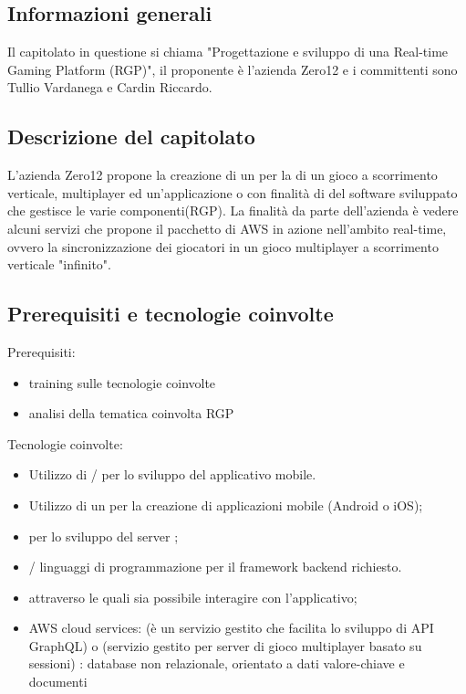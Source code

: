 \subsection{Informazioni generali}
Il capitolato in questione si chiama "Progettazione e sviluppo di una {Real-time Gaming Platform (RGP)}", il proponente è l'azienda Zero12 e i committenti sono Tullio Vardanega e Cardin Riccardo.

\subsection{Descrizione del capitolato}
L’azienda Zero12 propone la creazione di un  per la  di un gioco a scorrimento verticale, multiplayer ed un'applicazione  o  con finalità di  del software sviluppato che gestisce le varie componenti(RGP).
La finalità da parte dell’azienda è vedere alcuni servizi che propone il pacchetto di AWS in azione nell’ambito real-time, ovvero la sincronizzazione dei giocatori in un gioco multiplayer a scorrimento verticale "infinito".
\subsection{Prerequisiti e tecnologie coinvolte}
Prerequisiti:
\begin{itemize}
\item training sulle tecnologie coinvolte
\item analisi della tematica coinvolta RGP 
\end{itemize}
Tecnologie coinvolte:
\begin{itemize}
\item Utilizzo di / per lo sviluppo del applicativo mobile.
\item Utilizzo di un  per la creazione di applicazioni mobile (Android o iOS);
\item {} per lo sviluppo del server ;
\item {}/ linguaggi di programmazione per il framework backend richiesto.
\item {}  attraverso le quali sia possibile interagire con l'applicativo;
\item AWS cloud services: 
(è un servizio gestito che facilita lo sviluppo di API GraphQL) o (servizio gestito per server di gioco multiplayer basato su sessioni) 
: database non relazionale, orientato a dati valore-chiave e documenti
\end{itemize}

